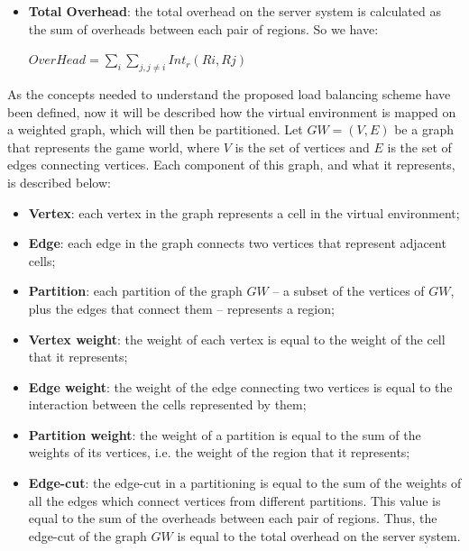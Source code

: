 \begin{itemize}
  \item \textbf{Total Overhead}: the total overhead on the server system is calculated as the sum of overheads between each pair of regions. So we have:

    \begin{center}
      $\displaystyle OverHead = \sum_{i} \sum_{j, j \neq i} Int_r(Ri,Rj)$
    \end{center}

\end{itemize}

As the concepts needed to understand the proposed load balancing scheme have been defined, now it will be described how the virtual environment is mapped on a weighted graph, which will then be partitioned. Let $GW = (V,E)$ be a graph that represents the game world, where $V$ is the set of vertices and $E$ is the set of edges connecting vertices. Each component of this graph, and what it represents, is described below:

\begin{itemize}
	\item \textbf{Vertex}: each vertex in the graph represents a cell in the virtual environment;
	\item \textbf{Edge}: each edge in the graph connects two vertices that represent adjacent cells;
	\item \textbf{Partition}: each partition of the graph $GW$ -- a subset of the vertices of $GW$, plus the edges that connect them -- represents a region;
	\item \textbf{Vertex weight}: the weight of each vertex is equal to the weight of the cell that it represents;
	\item \textbf{Edge weight}: the weight of the edge connecting two vertices is equal to the interaction between the cells represented by them;
	\item \textbf{Partition weight}: the weight of a partition is equal to the sum of the weights of its vertices, i.e. the weight of the region that it represents;
	\item \textbf{Edge-cut}: the edge-cut in a partitioning is equal to the sum of the weights of all the edges which connect vertices from different partitions. This value is equal to the sum of the overheads between each pair of regions. Thus, the edge-cut of the graph $GW$ is equal to the total overhead on the server system.
\end{itemize}

